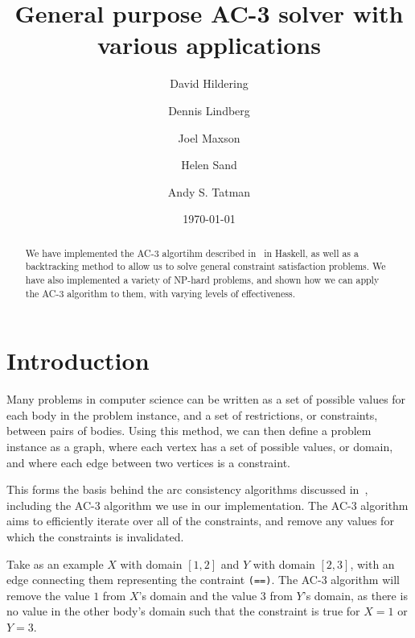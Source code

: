 \documentclass[12pt,a4paper]{article}
\title{General purpose AC-3 solver with various applications}
\author{David Hildering \and Dennis Lindberg \and Joel Maxson \and Helen Sand \and Andy S. Tatman}
\date{\today}
\begin{document}
\maketitle

\begin{abstract}
We have implemented the AC-3 algortihm described in~\cite{AC3} in Haskell, 
as well as a backtracking method to allow us to solve general constraint satisfaction 
problems. 
We have also implemented a variety of NP-hard problems, and shown how we can apply 
the AC-3 algorithm to them, with varying levels of effectiveness. 
\end{abstract}

\vfill

\tableofcontents

\clearpage


% 

\section{Introduction}\label{sec:intro}
Many problems in computer science can be written as a set of possible values for each 
body in the problem instance, and a set of restrictions, or constraints, between pairs of bodies.
Using this method, we can then define a problem instance as a graph, where each vertex has a set of possible values, or domain,
and where each edge between two vertices is a constraint.  

This forms the basis behind the arc consistency algorithms discussed in~\cite{AC3}, including the AC-3 algorithm 
we use in our implementation. 
The AC-3 algorithm aims to efficiently iterate over all of the constraints, 
and remove any values for which the constraints is invalidated.

Take as an example $X$ with domain $[1,2]$ and $Y$ with domain $[2,3]$, with an edge connecting them representing the contraint \verb:(==):.
The AC-3 algorithm will remove the value $1$ from $X$'s domain and the value $3$ from $Y$'s domain, 
as there is no value in the other body's domain such that the constraint is true for $X=1$ or $Y=3$.
\end{document}
